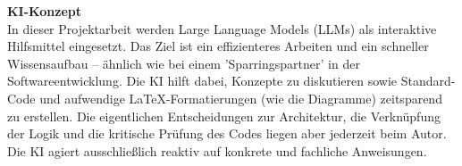 \documentclass[12pt, a4paper]{article}
\begin{document}
\vspace{0.5cm}
\textbf{KI-Konzept} \\
In dieser Projektarbeit werden Large Language Models (LLMs) als interaktive Hilfsmittel eingesetzt. Das Ziel ist ein effizienteres Arbeiten und ein schneller Wissensaufbau – ähnlich wie bei einem 'Sparringspartner' in der Softwareentwicklung. Die KI hilft dabei, Konzepte zu diskutieren sowie Standard-Code und aufwendige LaTeX-Formatierungen (wie die Diagramme) zeitsparend zu erstellen. Die eigentlichen Entscheidungen zur Architektur, die Verknüpfung der Logik und die kritische Prüfung des Codes liegen aber jederzeit beim Autor. Die KI agiert ausschließlich reaktiv auf konkrete und fachliche Anweisungen.
\end{document}
